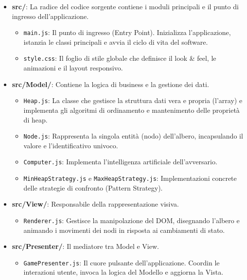 \documentclass[openany]{theme/uniprthesis}
\begin{document}
\begin{itemize}
    \item \textbf{src/}: La radice del codice sorgente contiene i moduli principali e il punto di ingresso dell'applicazione.
    \begin{itemize}
        \item \texttt{main.js}: Il punto di ingresso (Entry Point). Inizializza l'applicazione, istanzia le classi principali e avvia il ciclo di vita del software.
        \item \texttt{style.css}: Il foglio di stile globale che definisce il look \& feel, le animazioni e il layout responsivo.
    \end{itemize}
    
    \item \textbf{src/Model/}: Contiene la logica di business e la gestione dei dati.
    \begin{itemize}
        \item \texttt{Heap.js}: La classe che gestisce la struttura dati vera e propria (l'array) e implementa gli algoritmi di ordinamento e mantenimento delle proprietà di heap.
        \item \texttt{Node.js}: Rappresenta la singola entità (nodo) dell'albero, incapsulando il valore e l'identificativo univoco.
        \item \texttt{Computer.js}: Implementa l'intelligenza artificiale dell'avversario.
        \item \texttt{MinHeapStrategy.js} e \texttt{MaxHeapStrategy.js}: Implementazioni concrete delle strategie di confronto (Pattern Strategy).
    \end{itemize}
    
    \item \textbf{src/View/}: Responsabile della rappresentazione visiva.
    \begin{itemize}
        \item \texttt{Renderer.js}: Gestisce la manipolazione del DOM, disegnando l'albero e animando i movimenti dei nodi in risposta ai cambiamenti di stato.
    \end{itemize}
    
    \item \textbf{src/Presenter/}: Il mediatore tra Model e View.
    \begin{itemize}
        \item \texttt{GamePresenter.js}: Il cuore pulsante dell'applicazione. Coordin le interazioni utente, invoca la logica del Modello e aggiorna la Vista.
    \end{itemize}
\end{itemize}
\end{document}
